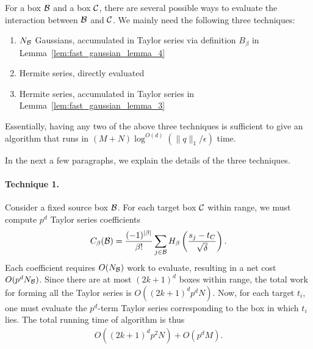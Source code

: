 For a box ${\cal B}$ and a box ${\cal C}$, there are several possible ways to evaluate the interaction between ${\cal B}$ and ${\cal C}$. We mainly need the following three techniques:
\begin{enumerate}
	\item $N_{\cal B}$ Gaussians, accumulated in Taylor series via definition $B_{\beta}$ in Lemma~\ref{lem:fast_gaussian_lemma_4}
	\item Hermite series, directly evaluated
	\item Hermite series, accumulated in Taylor series in Lemma~\ref{lem:fast_gaussian_lemma_3} %
\end{enumerate}
Essentially, having any two of the above three techniques is sufficient to give an algorithm that runs in $(M+N) \log^{O(d)} (\| q\|_1 /\epsilon)$ time.

In the next a few paragraphs, we explain the details of the three techniques.

\paragraph*{Technique 1.} Consider a fixed source box ${\cal B}$. For each target box ${\cal C}$ within range, we must compute $p^d$ Taylor series coefficients
\begin{align*}
C_{\beta} ( {\cal B} ) = \frac{ (-1)^{|\beta|} }{ \beta ! } \sum_{ j \in {\cal B} } H_{\beta} \left( \frac{ s_j - t_C }{ \sqrt{\delta} } \right).
\end{align*}
Each coefficient requires $O(N_{\cal B})$ work to evaluate, resulting in a net cost $O(p^d N_{\cal B})$. Since there are at most $(2k+1)^d$ boxes within range, the total work for forming all the Taylor series is $O( (2k+1)^d p^d N )$. Now, for each target $t_i$, one must evaluate the $p^d$-term Taylor series corresponding to the box in which $t_i$ lies. The total running time of algorithm is thus
\begin{align*}
O( (2k+1)^d p^2 N ) + O(p^d M).
\end{align*}


